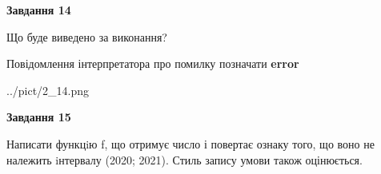 \documentclass[11pt, ukrainian]{article}
\begin{document}
{\begin {large}
{\begin {center}\textbf{Завдання 14}\end {center}}\par
Що буде виведено за виконання? \par
Повідомлення інтерпретатора про помилку позначати \textbf{error}

\begin{center}
	{../pict/2_14.png}
\end{center}
\newpage

{\begin {center}\textbf{Завдання 15}\end {center}}\par

Написати функцiю f, що отримує число і повертає ознаку того, що воно не належить iнтервалу (2020; 2021). Стиль запису умови також оцінюється.\par
\newpage

\end {large}}
\end{document}
